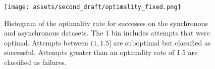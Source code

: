 \begin{figure}[t!]
    \centering
    \texttt{[image: assets/second\_draft/optimality\_fixed.png]}
    \caption{Histogram of the optimality rate for \gptfo{} \react{} successes on the synchronous and asynchronous datasets. The 1 bin includes attempts that were optimal. Attempts between $(1, 1.5]$ are suboptimal but classified as successful. Attempts greater than an optimality rate of 1.5 are classified as failures.
    }
    \label{fig:histogram_optimality}
\end{figure}